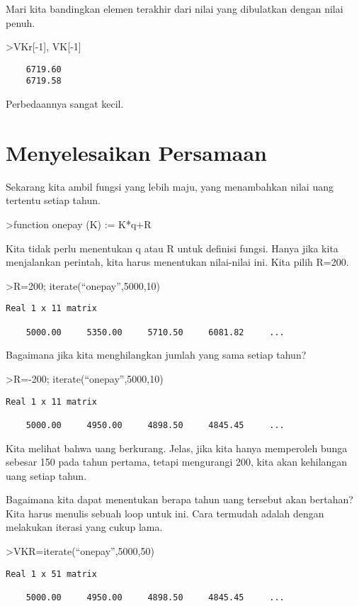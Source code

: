 \documentclass[
]{book}
\begin{document}
Mari kita bandingkan elemen terakhir dari nilai yang dibulatkan dengan nilai penuh.

\textgreater VKr{[}-1{]}, VK{[}-1{]}

\begin{verbatim}
    6719.60 
    6719.58 
\end{verbatim}

Perbedaannya sangat kecil.

\chapter{Menyelesaikan Persamaan}\label{menyelesaikan-persamaan}

Sekarang kita ambil fungsi yang lebih maju, yang menambahkan nilai uang tertentu setiap tahun.

\textgreater function onepay (K) := K*q+R

Kita tidak perlu menentukan q atau R untuk definisi fungsi. Hanya jika kita menjalankan perintah, kita harus menentukan nilai-nilai ini. Kita pilih R=200.

\textgreater R=200; iterate(``onepay'',5000,10)

\begin{verbatim}
Real 1 x 11 matrix

    5000.00     5350.00     5710.50     6081.82     ...
\end{verbatim}

Bagaimana jika kita menghilangkan jumlah yang sama setiap tahun?

\textgreater R=-200; iterate(``onepay'',5000,10)

\begin{verbatim}
Real 1 x 11 matrix

    5000.00     4950.00     4898.50     4845.45     ...
\end{verbatim}

Kita melihat bahwa uang berkurang. Jelas, jika kita hanya memperoleh bunga sebesar 150 pada tahun pertama, tetapi mengurangi 200, kita akan kehilangan uang setiap tahun.

Bagaimana kita dapat menentukan berapa tahun uang tersebut akan bertahan? Kita harus menulis sebuah loop untuk ini. Cara termudah adalah dengan melakukan iterasi yang cukup lama.

\textgreater VKR=iterate(``onepay'',5000,50)

\begin{verbatim}
Real 1 x 51 matrix

    5000.00     4950.00     4898.50     4845.45     ...
\end{verbatim}
\end{document}
